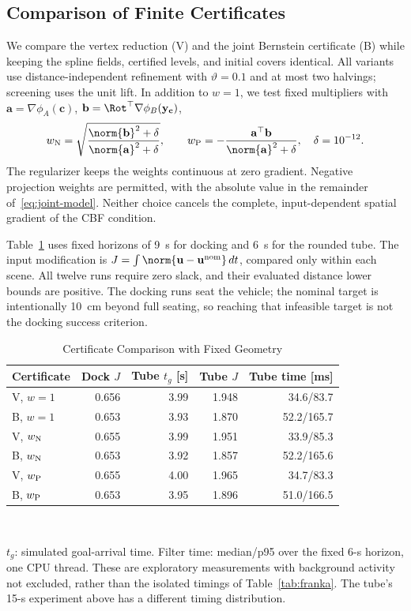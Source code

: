\subsection{Comparison of Finite Certificates}\label{sec:cert-comparison}
We compare the vertex reduction (V) and the joint Bernstein certificate (B) while keeping
the spline fields, certified levels, and initial covers identical. All variants use
distance-independent refinement with $\vartheta=0.1$ and at most two halvings; screening
uses the unit lift. In addition to $w=1$, we test fixed multipliers with
$\mathbf a=\nabla\phi_A(\mathbf c)$, $\mathbf b=\Rot^\top\nabla\phi_B(\mathbf y_{\mathbf c})$,
\begin{equation}
w_{\rm N}=\sqrt{\frac{\norm{\mathbf b}^2+\delta}{\norm{\mathbf a}^2+\delta}},\qquad
w_{\rm P}=-\frac{\mathbf a^\top\mathbf b}{\norm{\mathbf a}^2+\delta},\quad\delta=10^{-12}.
\end{equation}
The regularizer keeps the weights continuous at zero gradient. Negative projection weights
are permitted, with the absolute value in the remainder of~\eqref{eq:joint-model}.
Neither choice cancels the complete, input-dependent spatial gradient of the CBF condition.

Table~\ref{tab:cert-comparison} uses fixed horizons of 9~s for docking and 6~s for the rounded
tube. The input modification is $J=\int\norm{\mathbf u-\mathbf u^{\rm nom}}\,dt$, compared
only within each scene. All twelve runs require zero slack, and their evaluated distance
lower bounds are positive. The docking runs seat the vehicle; the nominal target is intentionally
10~cm beyond full seating, so reaching that infeasible target is not the docking success criterion.

\begin{table}[t]
\caption{Certificate Comparison with Fixed Geometry}
\label{tab:cert-comparison}
\centering\footnotesize
\setlength{\tabcolsep}{3pt}
\begin{tabular}{lrrrr}
\toprule
Certificate & Dock $J$ & Tube $t_g$ [s] & Tube $J$ & Tube time [ms]\\
\midrule
V, $w=1$       & 0.656 & 3.99 & 1.948 & 34.6/83.7\\
B, $w=1$       & 0.653 & 3.93 & 1.870 & 52.2/165.7\\
V, $w_{\rm N}$ & 0.655 & 3.99 & 1.951 & 33.9/85.3\\
B, $w_{\rm N}$ & 0.653 & 3.92 & 1.857 & 52.2/165.6\\
V, $w_{\rm P}$ & 0.655 & 4.00 & 1.965 & 34.7/83.3\\
B, $w_{\rm P}$ & 0.653 & 3.95 & 1.896 & 51.0/166.5\\
\bottomrule
\end{tabular}
\\[3pt]
\parbox{\columnwidth}{\footnotesize $t_g$: simulated goal-arrival time. Filter time: median/p95
over the fixed 6-s horizon, one CPU thread. These are exploratory measurements with background
activity not excluded, rather than the isolated timings of Table~\ref{tab:franka}. The tube's
15-s experiment above has a different timing distribution.}
\end{table}

